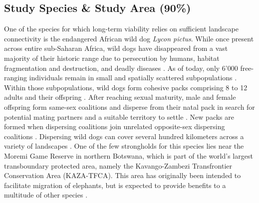 \documentclass[abstract=on,10pt,a4paper,bibliography=totocnumbered]{article}
\begin{document}
\subsection{Study Species \& Study Area (90\%)}
One of the species for which long-term viability relies on sufficient landscape
connectivity is the endangered African wild dog \textit{Lycon pictus}. While
once present across entire sub-Saharan Africa, wild dogs have disappeared from a
vast majority of their historic range due to persecution by humans, habitat
fragmentation and destruction, and deadly diseases \citep{Woodroffe.2012}. As of
today, only 6'000 free-ranging individuals remain in small and spatially
scattered subpopulations \citep{Woodroffe.2012}. Within those subpopulations,
wild dogs form cohesive packs comprising 8 to 12 adults and their offspring
\cite{McNutt.1995}. After reaching sexual maturity, male and female offspring
form same-sex coalitions and disperse from their natal pack in search for
potential mating partners and a suitable territory to settle \citep{McNutt.1996,
Behr.2020}. New packs are formed when dispersing coalitions join unrelated
opposite-sex dispersing coalitions \citep{McNutt.1996}. Dispersing wild dogs can
cover several hundred kilometers across a variety of landscapes
\citep{DaviesMostert.2012, Masenga.2016, Cozzi.2020, Hofmann.2021}. One of the
few strongholds for this species lies near the Moremi Game Reserve in northern
Botswana, which is part of the world's largest transboundary protected area,
namely the Kavango-Zambezi Transfrontier Conservation Area (KAZA-TFCA). This
area has originally been intended to facilitate migration of elephants, but is
expected to provide benefits to a multitude of other species \citep{Elliot.2014,
Brennan.2020, Hofmann.2021}.

\end{document}
